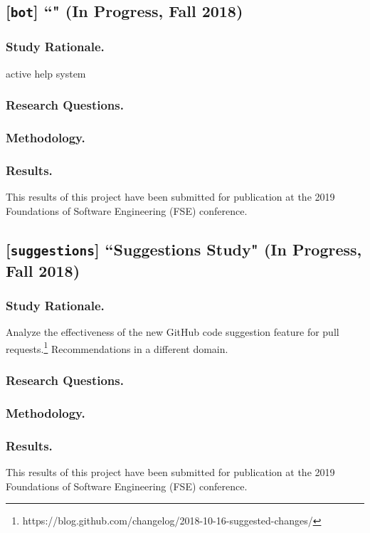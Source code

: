 \documentclass[runningheads]{llncs}
\begin{document}
\subsection{[\texttt{bot}] ``\TOOL" (In Progress, Fall 2018)}

\subsubsection{Study Rationale.} active help system~\cite{Fischer1984ActiveHelpSystems}

\subsubsection{Research Questions.}

\subsubsection{Methodology.}

\subsubsection{Results.} This results of this project have been submitted for publication at the 2019 Foundations of Software Engineering (FSE) conference.

\subsection{[\texttt{suggestions}] ``Suggestions Study" (In Progress, Fall 2018)}

\subsubsection{Study Rationale.} Analyze the effectiveness of the new GitHub code suggestion feature for pull requests.\footnote{https://blog.github.com/changelog/2018-10-16-suggested-changes/} Recommendations in a different domain.

\subsubsection{Research Questions.}

\subsubsection{Methodology.}

\subsubsection{Results.} This results of this project have been submitted for publication at the 2019 Foundations of Software Engineering (FSE) conference.
\end{document}
